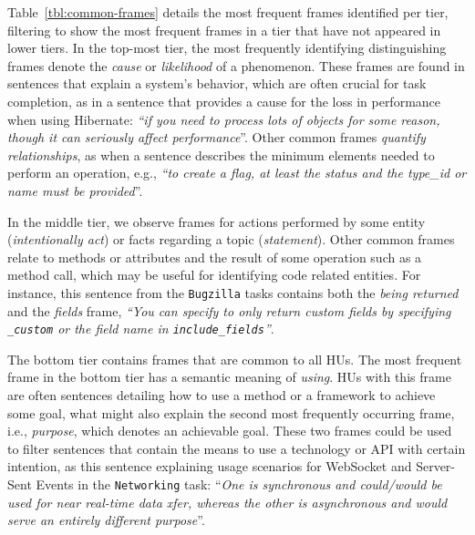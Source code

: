 Table~\ref{tbl:common-frames} details the most frequent frames identified per tier, filtering to show the 
most frequent frames in a tier that have not appeared in lower tiers.
In the top-most tier, the most frequently identifying distinguishing
frames denote the \textit{cause} or \textit{likelihood} of a phenomenon.
These frames are found in sentences that explain a system's behavior, which are often crucial for task completion,
as in a sentence that provides a cause for the loss in performance when using Hibernate:
 \textit{``if you need to process lots of objects for some reason, though it can seriously affect performance}''.
Other common frames \textit{quantify relationships},
as when a sentence describes the minimum elements needed to perform an operation, e.g., \textit{``to create a flag, at least the status and the type\_id or name must be provided}''.




In the middle tier, we observe frames for actions performed by some entity (\textit{intentionally act}) or facts regarding a topic (\textit{statement}).
Other common frames relate to methods or attributes and the result of some operation such as a method call, which may be useful for identifying code related entities.
For instance, this sentence from the \texttt{Bugzilla} tasks contains both the \textit{being returned} and the \textit{fields} frame, 
\textit{``You can specify to only return custom fields by specifying \texttt{\_custom} or the field name in \texttt{include\_fields}''}.






The bottom tier contains frames that are common to all HUs.
The most frequent frame in the bottom tier has a semantic meaning of \textit{using}.
HUs with this frame are often sentences detailing how to use a method or a
framework to achieve some goal, what might also explain the second most frequently occurring frame, i.e., \textit{purpose}, which denotes an achievable goal. 
These two frames could be used to filter sentences that contain the means
to use a technology or API with certain intention, as this sentence explaining usage scenarios for
WebSocket and Server-Sent Events in the \texttt{Networking} task:
``\textit{One is synchronous and could/would be used for near real-time data xfer, whereas the other is asynchronous and would serve an entirely different purpose}''.





